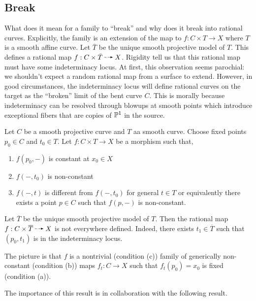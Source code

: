 \documentclass[12pt]{article}
\begin{document}
\subsection{Break}

\begin{rmk}
What does it mean for a family to ``break'' and why does it break into rational curves. Explicitly, the family is an extension of the map to $f : C \times T \to X$ where $T$ is a smooth affine curve. Let $\bar{T}$ be the unique smooth projective model of $T$. This defines a rational map $f : C \times \bar{T} \rat X$. Rigidity tell us that this rational map must have some indeterminacy locus. At first, this observation seems parochial: we shouldn't expect a random rational map from a surface to extend. However, in good circumstances, the indeterminacy locus will define rational curves on the target as the ``broken'' limit of the bent curve $C$. This is morally because indeterminacy can be resolved through blowups at smooth points which introduce exceptional fibers that are copies of $\P^1$ in the source. 
\end{rmk}

\begin{prop} \label{break}
Let $C$ be a smooth projective curve and $T$ aa smooth curve. Choose fixed points $p_0 \in C$ and $t_0 \in T$. Let $f : C \times T \to X$ be a morphism such that,
\begin{enumerate}
\item $f(p_0,-)$ is constant at $x_0 \in X$
\item $f(-,t_0)$ is non-constant
\item $f(-,t)$ is different from $f(-,t_0)$ for general $t \in T$ or equivalently there exists a point $p \in C$ such that $f(p, -)$ is non-constant.
\end{enumerate}
Let $\overline{T}$ be the unique smooth projective model of $T$. Then the rational map $f : C \times \overline{T} \rat X$ is not everywhere defined. Indeed, there exists $t_1 \in \overline{T}$ such that $(p_0, t_1)$ is in the indeterminacy locus.
\end{prop}

\begin{rmk}
The picture is that $f$ is a nontrivial (condition (c)) family of generically non-constant (condition (b)) maps $f_t : C \to X$ such that $f_t(p_0) = x_0$ is fixed (condition (a)).
\end{rmk}

\begin{rmk}
The importance of this result is in collaboration with the following result.
\end{rmk}
\end{document}
